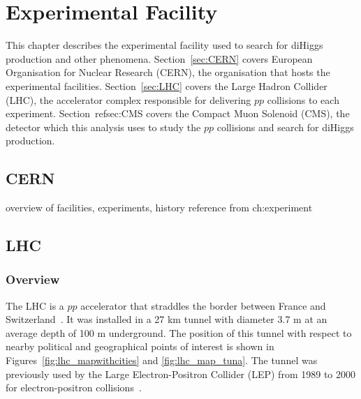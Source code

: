 
\chapter{Experimental Facility\label{ch:experiment}}

This chapter describes the experimental facility used to search for diHiggs production and other phenomena. Section~\ref{sec:CERN} covers European Organisation for Nuclear Research (CERN), the organisation
that hosts the experimental facilities. Section~\ref{sec:LHC} covers the Large Hadron Collider (LHC), the accelerator complex responsible for delivering $pp$ collisions to each experiment. Section~ref{sec:CMS}
covers the Compact Muon Solenoid (CMS), the detector which this analysis uses to study the $pp$ collisions and search for diHiggs production.


\section{CERN\label{sec:CERN}}
overview of facilities, experiments, history
reference from ch:experiment

\section{LHC\label{sec:LHC}}
\subsection{Overview}
The LHC is a $pp$ accelerator that straddles the border between France and Switzerland~\cite{cern-jinst-lhc}. It was installed in a 27 km tunnel with diameter 3.7 m at an average depth of 100 m underground.
The position of this tunnel with respect to nearby political and geographical points of interest is 
shown in Figures~\ref{fig:lhc_mapwithcities} and \ref{fig:lhc_map_tuna}.
The tunnel was previously
used by the Large Electron-Positron Collider (LEP) from 1989 to 2000 for electron-positron collisions~\cite{LEP_DR1979}.

